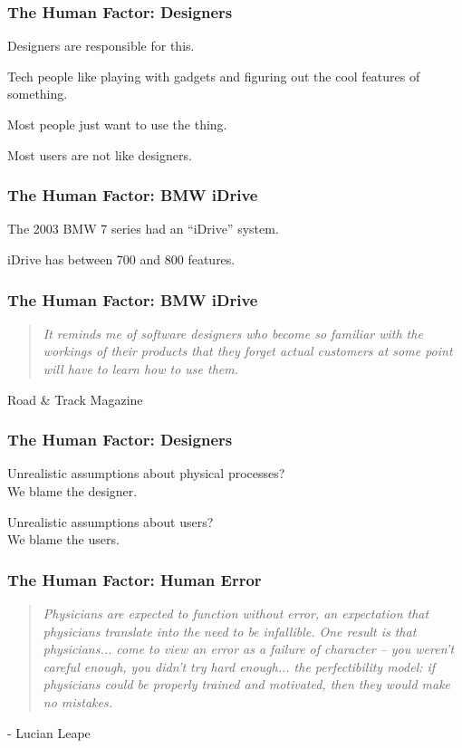\begin{frame}
\frametitle{The Human Factor: Designers}
\begin{changemargin}{1cm}
Designers are responsible for this.

Tech people like playing with gadgets and figuring out the cool features of something.

Most people just want to use the thing.

Most users are not like designers.

\end{changemargin}
\end{frame}

\begin{frame}
\frametitle{The Human Factor: BMW iDrive}
\begin{changemargin}{1cm}
The 2003 BMW 7 series had an ``iDrive'' system.

iDrive has between 700 and 800 features.

\end{changemargin}
\end{frame}

\begin{frame}
\frametitle{The Human Factor: BMW iDrive}
\begin{changemargin}{1cm}
\begin{quote}
\textit{It reminds me of software designers who become so familiar with the workings of their products that they forget actual customers at some point will have to learn how to use them.}
\end{quote}
\hfill Road \& Track Magazine
\end{changemargin}
\end{frame}

\begin{frame}
\frametitle{The Human Factor: Designers}
\begin{changemargin}{1cm}
Unrealistic assumptions about physical processes?\\
\quad We blame the designer.

Unrealistic assumptions about users? \\
\quad We blame the users.
\end{changemargin}
\end{frame}


\begin{frame}
\frametitle{The Human Factor: Human Error}
\begin{changemargin}{1cm}

\begin{quote}
\textit{Physicians are expected to function without error, an expectation that physicians translate into the need to be infallible. One result is that physicians... come to view an error as a failure of character -- you weren't careful enough, you didn't try hard enough... the perfectibility model: if physicians could be properly trained and motivated, then they would make no mistakes.}
\end{quote}
\hfill - Lucian Leape

\end{changemargin}
\end{frame}


